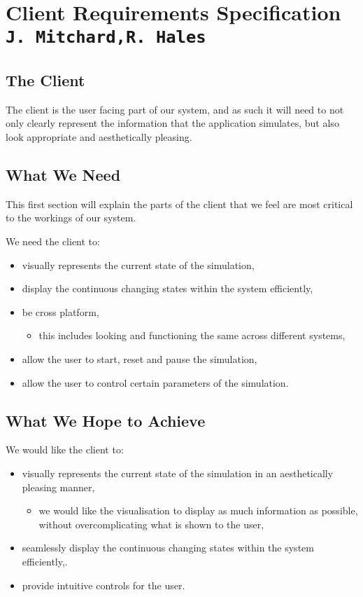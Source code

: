 \pagestyle{empty}

\section{Client Requirements Specification\\{\small\tt{J.~Mitchard,R.~Hales}}}

\subsection{The Client}
The client is the user facing part of our system, and as such it will need to not only clearly represent the information that the application simulates, but also look appropriate and aesthetically pleasing.

\subsection{What We Need}
This first section will explain the parts of the client that we feel are most critical to the workings of our system. 

We need the client to:
\begin{itemize}
	\item visually represents the current state of the simulation,
	\item display the continuous changing states within the system efficiently,
	\item be cross platform,
	\begin{itemize}
		\item this includes looking and functioning the same across different systems,
	\end{itemize}
	\item allow the user to start, reset and pause the simulation,
	\item allow the user to control certain parameters of the simulation.
\end{itemize}

\subsection{What We Hope to Achieve}
We would like the client to:
\begin{itemize}
	\item visually represents the current state of the simulation in an aesthetically pleasing manner,
	\begin{itemize}
		\item we would like the visualisation to display as much information as possible, without overcomplicating what is shown to the user,
	\end{itemize}
	\item seamlessly display the continuous changing states within the system efficiently,.
	\item provide intuitive controls for the user.
\end{itemize}



\clearpage
\endinput
